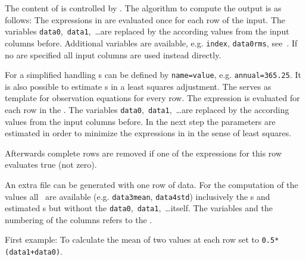 The content of  is controlled by .
The algorithm to compute the output is as follows:
The expressions in  are evaluated once for each row of the input.
The variables \verb|data0|,~\verb|data1|,~\ldots are replaced by the according values from the input columns before.
Additional variables are available, e.g. \verb|index|, \verb|data0rms|, see~.
If no  are specified all input columns are used instead directly.

For a simplified handling s can be defined by \verb|name=value|, e.g. \verb|annual=365.25|.
It is also possible to estimate s in a least squares adjustment.
The  serves as template for observation equations for every row.
The expression  is evaluated for each row in the .
The variables \verb|data0|,~\verb|data1|,~\ldots are replaced by the according values from the input columns before.
In the next step the parameters are estimated in order to minimize the expressions in 
in the sense of least squares.

Afterwards complete rows are removed if one of the  expressions for this row evaluates true (not zero).

An extra  file can be generated with one row of data. For the computation of the  values
all~ are available (e.g. \verb|data3mean|, \verb|data4std|)
inclusively the s and estimated s but without the \verb|data0|,~\verb|data1|,~\ldots itself.
The variables and the numbering of the columns refers to the .

First example: To calculate the mean of two values at each row set  to \verb|0.5*(data1+data0)|.

